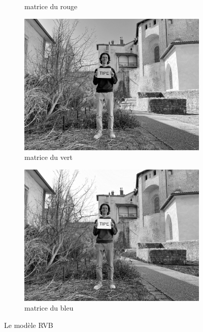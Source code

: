\documentclass{article}
\begin{document}
\begin{figure}[htbp]
\begin{subfigure}[b]{0.24\textwidth}
        \caption{matrice du rouge}
    \end{subfigure}
    \hfill
    \begin{subfigure}[b]{0.24\textwidth}
        \includegraphics[width=\textwidth]{transformation_couleur/vert.png}
        \caption{matrice du vert}
    \end{subfigure}
    \hfill
    \begin{subfigure}[b]{0.24\textwidth}
        \includegraphics[width=\textwidth]{transformation_couleur/bleu.png}
        \caption{matrice du bleu}
    \end{subfigure}
    \caption{Le modèle RVB}
\end{figure}
\end{document}
